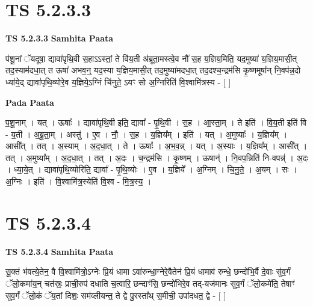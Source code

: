 \documentclass[17pt]{extarticle}
\begin{document}
\section*{ TS 5.2.3.3 }

\textbf{TS 5.2.3.3 } \newline
\textbf{Samhita Paata} \newline

प॑शू॒नां ॅयदूषा॒ द्यावा॑पृथि॒वी स॒हाऽऽस्तां॒ ते वि॑य॒ती अ॑ब्रूता॒मस्त्वे॒व नौ॑ स॒ह य॒ज्ञिय॒मिति॒ यद॒मुष्या॑ य॒ज्ञिय॒मासी॒त् तद॒स्याम॑दधा॒त् त ऊषा॑ अभव॒न्॒ यद॒स्या य॒ज्ञिय॒मासी॒त् तद॒मुष्या॑मदधा॒त् तद॒दश्च॒न्द्रम॑सि कृ॒ष्णमूषा᳚न् नि॒वप॑न्न॒दो ध्या॑ये॒द् द्यावा॑पृथि॒व्योरे॒व य॒ज्ञिये॒ऽग्निं चि॑नुते॒ ऽयꣳ सो अ॒ग्निरिति॑ वि॒श्वामि॑त्रस्य - [  ] \newline

\textbf{Pada Paata} \newline

प॒शू॒नाम् । यत् । ऊषाः᳚ । द्यावा॑पृथि॒वी इति॒ द्यावा᳚ - पृ॒थि॒वी । स॒ह । आ॒स्ता॒म् । ते इति॑ । वि॒य॒ती इति॑ वि - य॒ती । अ॒ब्रू॒ता॒म् । अस्तु॑ । ए॒व । नौ॒ । स॒ह । य॒ज्ञिय᳚म् । इति॑ । यत् । अ॒मुष्याः᳚ । य॒ज्ञिय᳚म् । आसी᳚त् । तत् । अ॒स्याम् । अ॒द॒धा॒त् । ते । ऊषाः᳚ । अ॒भ॒व॒न्न् । यत् । अ॒स्याः । य॒ज्ञिय᳚म् । आसी᳚त् । तत् । अ॒मुष्या᳚म् । अ॒द॒धा॒त् । तत् । अ॒दः । च॒न्द्रम॑सि । कृ॒ष्णम् । ऊषान्॑ । नि॒वप॒न्निति॑ नि-वपन्न्॑ । अ॒दः । ध्या॒ये॒त् । द्यावा॑पृथि॒व्योरिति॒ द्यावा᳚ - पृ॒थि॒व्योः । ए॒व । य॒ज्ञिये᳚ । अ॒ग्निम् । चि॒नु॒ते॒ । अ॒यम् । सः । अ॒ग्निः । इति॑ । वि॒श्वामि॑त्र॒स्येति॑ वि॒श्व - मि॒त्र॒स्य॒ ।  \newline




\section*{ TS 5.2.3.4 }

\textbf{TS 5.2.3.4 } \newline
\textbf{Samhita Paata} \newline

सू॒क्तं भ॑वत्ये॒तेन॒ वै वि॒श्वामि॑त्रो॒ऽग्नेः प्रि॒यं धामा ऽवा॑रुन्धा॒ग्नेरे॒वैतेन॑ प्रि॒यं धामाव॑ रुन्धे॒ छन्दो॑भि॒र्वै दे॒वाः सु॑व॒र्गं ॅलो॒कमा॑य॒न् चत॑स्रः॒ प्राची॒रुप॑ दधाति च॒त्वारि॒ छन्दाꣳ॑सि॒ छन्दो॑भिरे॒व तद्-यज॑मानः सुव॒र्गं ॅलो॒कमे॑ति॒ तेषाꣳ॑ सुव॒र्गं ॅलो॒कं ॅय॒तां दिशः॒ सम॑व्लीयन्त॒ ते द्वे पु॒रस्ता᳚थ् स॒मीची॒ उपा॑दधत॒ द्वे - [  ] \newline
\end{document}
